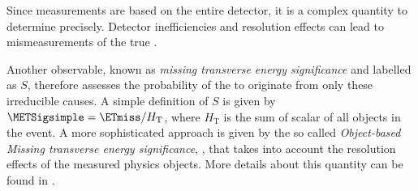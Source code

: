 Since \ETmiss measurements are based on the entire detector, it is a complex quantity to determine precisely. Detector inefficiencies and resolution effects can lead to mismeasurements of the true \ETmiss.

Another observable, known as \emph{missing transverse energy significance} and labelled as $S$, therefore assesses the probability of the \ETmiss to originate from only these irreducible causes.
A simple definition of $S$ is given by $\METSigsimple = \ETmiss / H_{\text{T}}$, where $H_{\text{T}}$ is the sum of scalar \pT of all objects in the event.
A more sophisticated approach is given by the so called \emph{Object-based Missing transverse energy significance}, \METSigobject, that takes into account the resolution effects of the measured physics objects.
More details about this quantity can be found in .






